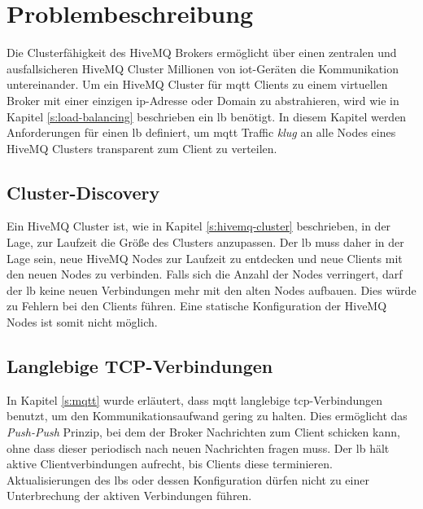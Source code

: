 \section{Problembeschreibung} \label{s:problem}
Die Clusterfähigkeit des HiveMQ Brokers ermöglicht über einen zentralen und ausfallsicheren HiveMQ Cluster Millionen von \ac{iot}-Geräten die Kommunikation untereinander.
Um ein HiveMQ Cluster für \ac{mqtt} Clients zu einem virtuellen Broker mit einer einzigen \ac{ip}-Adresse oder Domain zu abstrahieren, wird wie in Kapitel \ref{s:load-balancing} beschrieben ein \acl{lb} benötigt.
In diesem Kapitel werden Anforderungen für einen \acl{lb} definiert, um \ac{mqtt} Traffic \textit{klug} an alle Nodes eines HiveMQ Clusters transparent zum Client zu verteilen.

\subsection{Cluster-Discovery} \label{sp:cluster-discovery}
Ein HiveMQ Cluster ist, wie in Kapitel \ref{s:hivemq-cluster} beschrieben, in der Lage, zur Laufzeit die Grö{\ss}e des Clusters anzupassen. Der \acl{lb} muss daher in der Lage sein, neue HiveMQ Nodes zur Laufzeit zu entdecken und neue Clients mit den neuen Nodes zu verbinden. Falls sich die Anzahl der Nodes verringert, darf der \acl{lb} keine neuen Verbindungen mehr mit den alten Nodes aufbauen. Dies würde zu Fehlern bei den Clients führen.
Eine statische Konfiguration der HiveMQ Nodes ist somit nicht möglich.

\subsection{Langlebige TCP-Verbindungen}
In Kapitel \ref{s:mqtt} wurde erläutert, dass \ac{mqtt} langlebige \ac{tcp}-Verbindungen benutzt, um den Kommunikationsaufwand gering zu halten.
Dies ermöglicht das \textit{Push-Push} Prinzip, bei dem der Broker Nachrichten zum Client schicken kann, ohne dass dieser periodisch nach neuen Nachrichten fragen muss.
Der \acl{lb} hält aktive Clientverbindungen aufrecht, bis Clients diese terminieren.
Aktualisierungen des \aclp{lb} oder dessen Konfiguration dürfen nicht zu einer Unterbrechung der aktiven Verbindungen führen.

